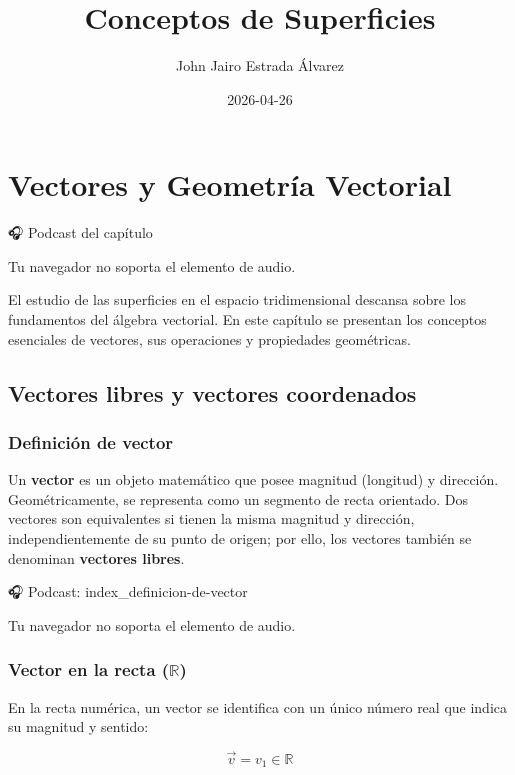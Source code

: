 \documentclass[
]{book}
\title{Conceptos de Superficies}
\author{John Jairo Estrada Álvarez}
\date{2026-04-26}
\begin{document}
\maketitle

{
\setcounter{tocdepth}{1}
\tableofcontents
}
\chapter{Vectores y Geometría Vectorial}\label{vectores}

🎧 Podcast del capítulo

Tu navegador no soporta el elemento de audio.

El estudio de las superficies en el espacio tridimensional descansa sobre los fundamentos del álgebra vectorial. En este capítulo se presentan los conceptos esenciales de vectores, sus operaciones y propiedades geométricas.

\section{Vectores libres y vectores coordenados}\label{vectores-libres-y-vectores-coordenados}

\subsection{Definición de vector}\label{definiciuxf3n-de-vector}

Un \textbf{vector} es un objeto matemático que posee magnitud (longitud) y dirección. Geométricamente, se representa como un segmento de recta orientado. Dos vectores son equivalentes si tienen la misma magnitud y dirección, independientemente de su punto de origen; por ello, los vectores también se denominan \textbf{vectores libres}.

🎧 Podcast: index\_definicion-de-vector

Tu navegador no soporta el elemento de audio.

\subsection{\texorpdfstring{Vector en la recta (\(\mathbb{R}\))}{Vector en la recta (\textbackslash mathbb\{R\})}}\label{vector-en-la-recta-mathbbr}

En la recta numérica, un vector se identifica con un único número real que indica su magnitud y sentido:

\[
\vec{v} = v_1 \in \mathbb{R}
\]
\end{document}
